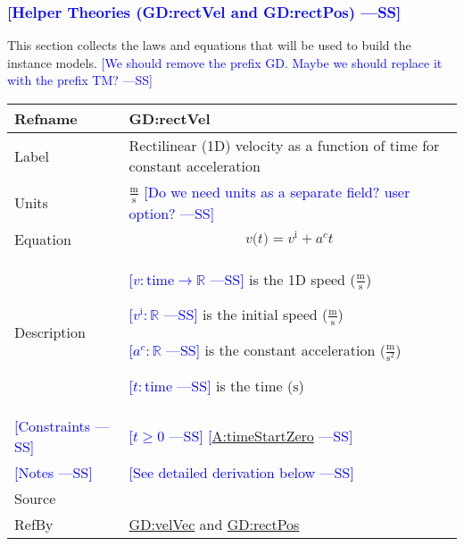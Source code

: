 \documentclass[12pt]{article}
\newcommand{\authornote}[3]{\textcolor{#1}{[#3 ---#2]}}
\newcommand{\authornote}[3]{}
\newcommand{\wss}[1]{\authornote{blue}{SS}{#1}}
\begin{document}
\subsubsection{\wss{Helper Theories (GD:rectVel and GD:rectPos)}}
\label{Sec:GDs}
This section collects the laws and equations that will be used to build the instance models.
\wss{We should remove the prefix GD.  Maybe we should replace it with the prefix
TM?}
\medskip
\noindent
\begin{minipage}{\textwidth}
\begin{tabular}{>{\raggedright}p{}>{\raggedright\arraybackslash}p{}}
\toprule \textbf{Refname} & \textbf{GD:rectVel}
\label{GD:rectVel}
\\ \midrule
Label & Rectilinear (1D) velocity as a function of time for constant acceleration
        
\\ \midrule
Units & $\frac{\text{m}}{\text{s}}$ \wss{Do we need units as a separate field? user option?}
\\ \midrule
Equation & \begin{displaymath}
           v\text{(}t\text{)}={v^{\text{i}}}+{a^{c}} t
           \end{displaymath}
\\ \midrule
Description & \begin{symbDescription}
              \item{\wss{$v: \text{time} \rightarrow \mathbb{R}$} is the 1D speed ($\frac{\text{m}}{\text{s}}$)}
              \item{\wss{${v^{\text{i}}: \mathbb{R}}$} is the initial speed ($\frac{\text{m}}{\text{s}}$)}
              \item{\wss{${a^{c}: \mathbb{R}}$} is the constant acceleration ($\frac{\text{m}}{\text{s}^{2}}$)}
              \item{\wss{$t: \text{time}$} is the time (${\text{s}}$)}
              \end{symbDescription}

\\ \midrule
\wss{Constraints} & \wss{$t \geq 0$} \wss{\hyperref[timeStartZero]{A:timeStartZero}}

\\ \midrule
\wss{Notes} & \wss{See detailed derivation below}

\\ \midrule
Source & \cite[(pg. 8)]{hibbeler2004}
         
\\ \midrule
RefBy & \hyperref[GD:velVec]{GD:velVec} and \hyperref[GD:rectPos]{GD:rectPos}
        
\\ \bottomrule
\end{tabular}
\end{minipage}
\end{document}
